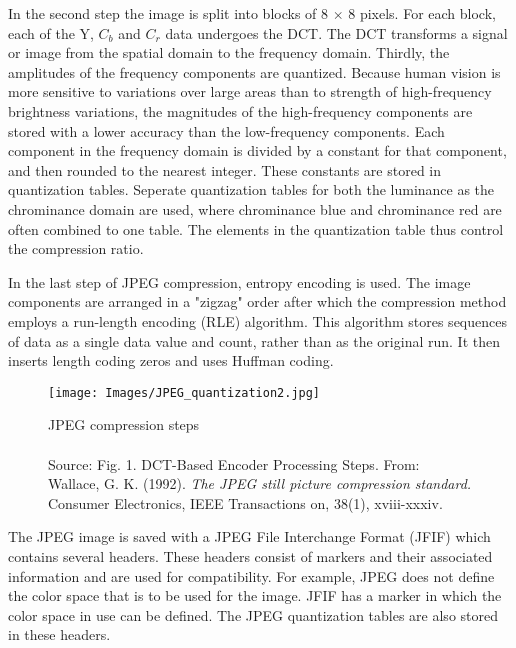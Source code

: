 In the second step the image is split into blocks of 8 $\times$ 8 pixels. For each block, each of the Y, $C_b$ and $C_r$ data undergoes the DCT. The DCT transforms a signal or image from the spatial domain to the frequency domain. Thirdly, the amplitudes of the frequency components are quantized. Because human vision is more sensitive to variations over large areas than to strength of high-frequency brightness variations,  the magnitudes of the high-frequency components are stored with a lower accuracy than the low-frequency components. Each component in the frequency domain is divided by a constant for that component, and then rounded to the nearest integer. These constants are stored in quantization tables. Seperate quantization tables for both the luminance as the chrominance domain are used, where chrominance blue and chrominance red are often combined to one table. The elements in the quantization table thus control the compression ratio.

In the last step of JPEG compression, entropy encoding is used. The image components are arranged in a "zigzag" order after which the compression method employs a run-length encoding (RLE) algorithm. This algorithm stores sequences of data as a single data value and count, rather than as the original run. It then inserts length coding zeros and uses Huffman coding.

\begin{figure}[h]
\centering
\texttt{[image: Images/JPEG\_quantization2.jpg]}
\captionsetup{justification=centering}

\caption{JPEG compression steps\\~\\{\small Source: Fig. 1. DCT-Based Encoder Processing Steps. From: Wallace, G. K. (1992). \textit{The JPEG still picture compression standard.} Consumer Electronics, IEEE Transactions on, 38(1), xviii-xxxiv.\cite{wallace1992jpeg}}}
\label{fig:jpeg}

\end{figure}

The JPEG image is saved with a JPEG File Interchange Format (JFIF) which contains several headers. These headers consist of markers and their associated information and are used for compatibility. For example, JPEG does not define the color space that is to be used for the image. JFIF has a marker in which the color space in use can be defined. The JPEG quantization tables are also stored in these headers.



